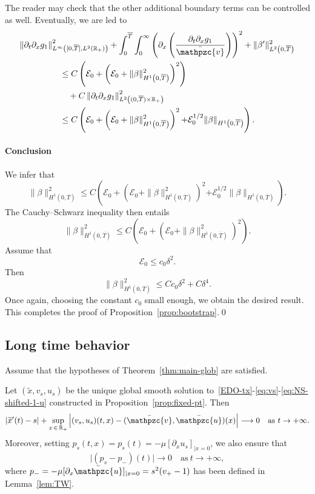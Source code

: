 \documentclass[AHL,Unicode,longabstracts,published]{cedram}
\newcommand{\R}{\mathbb{R}}
\newcommand{\p}{\partial}
\newcommand{\bv}{\bar{\mathpzc{v}}}
\newcommand{\bu}{\bar{\mathpzc{u}}}
\newcommand{\cE}{\mathcal E}
\newcommand{\tx}{\widetilde{x}}
\newcommand{\tx}{\widetilde{x}}
\begin{document}
The reader may check that the other additional boundary terms can be controlled as well. Eventually, we are led to
\begin{multline*}
\left\| \p_t \p_x g_1\right\|_{L^\infty\left([0,\overline{T}], L^2(\R_+)\right)}^2 + \int_0^{\overline{T}} \int_0^\infty \left(\p_x \left(\frac{\p_t \p_x g_1}{\bv}\right) \right)^2 + \|\beta'\|_{L^2\left(0, \overline{T}\right)}^2\\
\begin{aligned}
&\leq C\left(\cE_0 + \left(\cE_0+ \|\beta\|_{H^1\left(0,\overline{T}\right)}^2\right)^2 \right)\\
&\quad + C \left\|\p_t\p_x g_1\right\|_{L^2\left((0,\overline{T})\times \R_+\right)}^2\\
&\leq C \left(\cE_0 + \left(\cE_0 + \|\beta\|_{H^1\left(0,\overline{T}\right)}^2\right)^2 {+ \cE_0^{1/2} \|\beta\|_{H^1\left(0,\overline{T}\right)}}
\right).
\end{aligned}
\end{multline*}


\paragraph{Conclusion}

We infer that
\[
\|\beta\|_{H^1\left(0,\overline{T}\right)}^2 \leq C \left(\cE_0+ \left(\cE_0 + \|\beta\|_{H^1\left(0,\overline{T}\right)}^2\right)^2 {+ \cE_0^{1/2} \|\beta\|_{H^1\left(0,\overline{T}\right)}}
\right).
\]
The Cauchy--Schwarz inequality then entails
\[
\|\beta\|_{H^1\left(0,\overline{T}\right)}^2 \leq C \left(\cE_0+ \left(\cE_0 + \|\beta\|_{H^1\left(0,\overline{T}\right)}^2\right)^2
\right).
\]
Assume that
\[
\cE_0\leq c_0 \delta^2.
\]
Then
\[
\|\beta\|_{H^1\left(0,\overline{T}\right)}^2 \leq C c_0 \delta^2 + C \delta^4.
\]
Once again, choosing the constant $c_0$ small enough, we obtain the desired result. This completes the proof of Proposition~\ref{prop:bootstrap}.\qed

\subsection{Long time behavior}\label{ssec:stability}

\begin{coro}
Assume that the hypotheses of Theorem~\ref{thm:main-glob} are satisfied.

Let $(\tx, v_s,u_s)$ be the unique global smooth solution to~\eqref{EDO-tx}-\eqref{eq:vs}-\eqref{eq:NS-shifted-1-u} constructed in Proposition~\ref{prop:fixed-pt}. Then
\begin{equation}
\left|\tx'(t) - s\right| + \sup_{x\,\in\,\R_+} \Big| (v_s,u_s)(t,x) - (\bv, \bu)(x) \Big| \longrightarrow 0 \quad \text{as}~t \to +\infty.
\end{equation}
Moreover, setting $p_s(t,x) = p_s(t) = -\mu [\partial_x u_s]_{|x=0}$, we also ensure that
\begin{equation*}
\big|(p_s - p_-)(t)\big| \longrightarrow 0 \quad \text{as}~t \to +\infty,
\end{equation*}
where $p_- = -\mu [\partial_x \bu]_{|x=0} = s^2(v_+-1)$ has been defined in Lemma~\ref{lem:TW}.
\end{coro}
\end{document}
